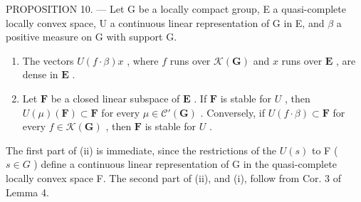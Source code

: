 PROPOSITION 10. --- Let G be a locally compact group, E a quasi-complete locally convex space, U a continuous linear representation of G in E, and \(\beta\) a positive measure on G with support G.

\begin{enumerate}
\def\labelenumi{(\roman{enumi})}
\item
  The vectors \(U(f \cdot \beta)x\) , where \(f\) runs over \(\mathcal{K}(\mathbf{G})\) and \(x\) runs over \(\mathbf{E}\) , are dense in \(\mathbf{E}\) .
\item
  Let \(\mathbf{F}\) be a closed linear subspace of \(\mathbf{E}\) . If \(\mathbf{F}\) is stable for \(U\) , then \(U(\mu)(\mathbf{F}) \subset \mathbf{F}\) for every \(\mu \in \mathcal{C}'(\mathbf{G})\) . Conversely, if \(U(f \cdot \beta) \subset \mathbf{F}\) for every \(f \in \mathcal{K}(\mathbf{G})\) , then \(\mathbf{F}\) is stable for \(U\) .
\end{enumerate}

The first part of (ii) is immediate, since the restrictions of the \(U(s)\) to F ( \(s \in G\) ) define a continuous linear representation of G in the quasi-complete locally convex space F. The second part of (ii), and (i), follow from Cor. 3 of Lemma 4.

